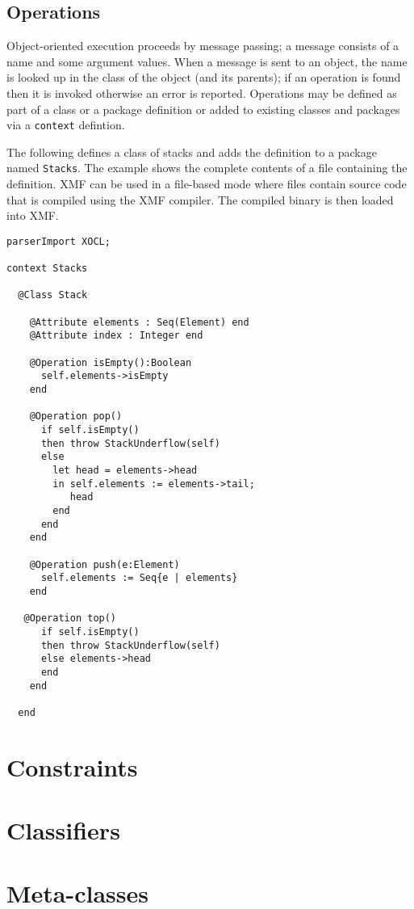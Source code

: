 \documentclass{article}
\begin{document}
\subsection{Operations}

Object-oriented execution proceeds by message passing; a message consists of a name and
some argument values. When a message is sent to an object, the name is looked up in the class
of the object (and its parents); if an operation is found then it is invoked otherwise an
error is reported. Operations may be defined as part of a class or a package definition or 
added to existing classes and packages via a {\tt context} defintion.

The following defines a class of stacks and adds the definition to a package named {\tt Stacks}.
The example shows the complete contents of a file containing the definition. XMF can be used
in a file-based mode where files contain source code that is compiled using the XMF compiler.
The compiled binary is then loaded into XMF.
\begin{verbatim}
parserImport XOCL;

context Stacks

  @Class Stack
  
    @Attribute elements : Seq(Element) end
    @Attribute index : Integer end 
    
    @Operation isEmpty():Boolean
      self.elements->isEmpty
    end
    
    @Operation pop()
      if self.isEmpty()
      then throw StackUnderflow(self)
      else 
        let head = elements->head
        in self.elements := elements->tail;
           head
        end
      end
    end
    
    @Operation push(e:Element)
      self.elements := Seq{e | elements}
    end
    
   @Operation top()
      if self.isEmpty()
      then throw StackUnderflow(self)
      else elements->head
      end
    end
    
  end
\end{verbatim}  

\section{Constraints}

\section{Classifiers}

\section{Meta-classes}
\end{document}
